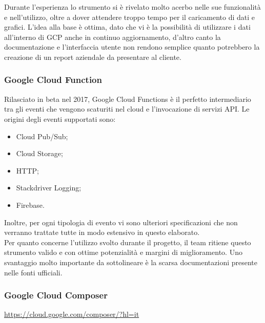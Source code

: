 Durante l'esperienza lo strumento si è rivelato molto acerbo nelle sue funzionalità e nell'utilizzo, oltre a dover attendere troppo tempo per il caricamento di dati e grafici. L'idea alla base è ottima, dato che vi è la possibilità di utilizzare i dati all'interno di GCP anche in continuo aggiornamento, d'altro canto la documentazione e l'interfaccia utente non rendono semplice quanto potrebbero la creazione di un report aziendale da presentare al cliente.
\subsubsection{Google Cloud Function}
Rilasciato in beta nel 2017, Google Cloud Functions \cite{GoogleCloudFunctions} è il perfetto intermediario tra gli eventi che vengono scaturiti nel cloud e l'invocazione di servizi API. Le origini degli eventi supportati sono:
\begin{itemize}
	\item Cloud Pub/Sub;
	\item Cloud Storage;
	\item HTTP;
	\item Stackdriver Logging;
	\item Firebase. 
\end{itemize}
Inoltre, per ogni tipologia di evento vi sono ulteriori specificazioni che non verranno trattate tutte in modo estensivo in questo elaborato.
\\
Per quanto concerne l'utilizzo svolto durante il progetto, il team ritiene questo strumento valido e con ottime potenzialità e margini di miglioramento. Uno svantaggio molto importante da sottolineare è la scarsa documentazioni presente nelle fonti ufficiali.
\subsubsection{Google Cloud Composer}
\url{https://cloud.google.com/composer/?hl=it}
